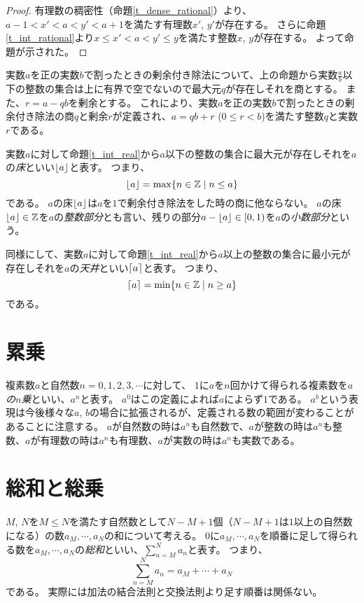 \begin{proof}
有理数の稠密性（命題\ref{t_dense_rational}）より、$a-1 < x' < a < y' < a+1$を満たす有理数$x'$, $y'$が存在する。
さらに命題\ref{t_int_rational}より$x \le x' < a < y' \le y$を満たす整数$x$, $y$が存在する。
よって命題が示された。
\end{proof}

実数$a$を正の実数$b$で割ったときの剰余付き除法について、上の命題から実数$\frac{a}{b}$以下の整数の集合は上に有界で空でないので最大元$q$が存在しそれを商とする。
また、$r = a-q b$を剰余とする。
これにより、実数$a$を正の実数$b$で割ったときの剰余付き除法の商$q$と剰余$r$が定義され、$a = q b+r$ ($0 \le r < b$)を満たす整数$q$と実数$r$である。

実数$a$に対して命題\ref{t_int_real}から$a$以下の整数の集合に最大元が存在しそれを$a$の\emph{床}といい$\lfloor a\rfloor$と表す。
つまり、
$$
\lfloor a\rfloor = \max\{ n \in \mathbb{Z} \mid n \le a \}
$$
である。
$a$の床$\lfloor a\rfloor$は$a$を$1$で剰余付き除法をした時の商に他ならない。
$a$の床$\lfloor a\rfloor \in \mathbb{Z}$を$a$の\emph{整数部分}とも言い、残りの部分$a-\lfloor a\rfloor \in [0, 1)$を$a$の\emph{小数部分}という。

同様にして、実数$a$に対して命題\ref{t_int_real}から$a$以上の整数の集合に最小元が存在しそれを$a$の\emph{天井}といい$\lceil a\rceil$と表す。
つまり、
$$
\lceil a\rceil = \min\{ n \in \mathbb{Z} \mid n \ge a \}
$$
である。

\section{累乗}

複素数$a$と自然数$n = 0, 1, 2, 3, \cdots$に対して、
$1$に$a$を$n$回かけて得られる複素数を\emph{$a$の$n$乗}といい、$a^n$と表す。
$a^0$はこの定義によれば$a$によらず$1$である。
$a^b$という表現は今後様々な$a$, $b$の場合に拡張されるが、定義される数の範囲が変わることがあることに注意する。
$a$が自然数の時は$a^n$も自然数で、$a$が整数の時は$a^n$も整数、$a$が有理数の時は$a^n$も有理数、$a$が実数の時は$a^n$も実数である。

\section{総和と総乗}

$M$, $N$を$M \le N$を満たす自然数として$N-M+1$個（$N-M+1$は$1$以上の自然数になる）の数$a_M, \cdots, a_N$の和について考える。
$0$に$a_M, \cdots, a_N$を順番に足して得られる数を$a_M, \cdots, a_N$の\emph{総和}といい、$\sum_{n = M}^N a_n$と表す。
つまり、
$$
\sum_{n = M}^N a_n = a_M+\cdots+a_N
$$
である。
実際には加法の結合法則と交換法則より足す順番は関係ない。

